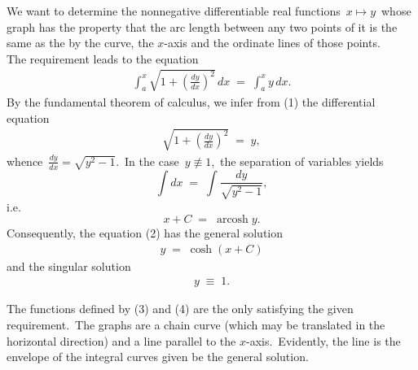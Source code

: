 \documentclass[12pt]{article}
\DeclareMathOperator{\arcosh}{arcosh}
\theoremstyle{definition}
\begin{document}

We want to determine the nonnegative differentiable real functions \,$x \mapsto y$\, whose graph has the property that the arc length between any two points of it is the same as the   by the curve, the $x$-axis and the ordinate lines of those points.\\

The requirement leads to the equation
\begin{align}
\int_a^x\!\sqrt{1+\left(\frac{dy}{dx}\right)^2}\,dx \;=\; \int_a^x\!y\,dx.
\end{align}
By the fundamental theorem of calculus, we infer from (1) the differential equation
\begin{align}
\sqrt{1+\left(\frac{dy}{dx}\right)^2} \;=\; y,
\end{align}
whence\, $\frac{dy}{dx} = \sqrt{y^2\!-\!1}$.\, In the case\, $y \not\equiv 1$,\, the separation of variables yields
$$\int\!dx \;=\; \int\!\frac{dy}{\sqrt{y^2\!-\!1}},$$
i.e. 
$$x\!+\!C \;=\; \arcosh{y}.$$
Consequently, the equation (2) has the general solution
\begin{align}
y \;=\; \cosh(x\!+\!C)
\end{align}
and the singular solution
\begin{align}
y \;\equiv\; 1.
\end{align}

The functions defined by (3) and (4) are the only  satisfying the given requirement.\, The graphs are a chain curve (which may be translated in the horizontal direction) and a line parallel to the $x$-axis.\, Evidently, the line is the envelope of the integral curves given be the general solution.
\end{document}
